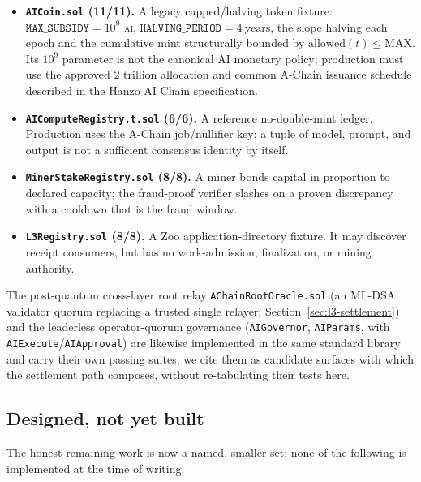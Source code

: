 \begin{itemize}[leftmargin=1.4em]
the proof-type profiles.
\item \textbf{\texttt{AICoin.sol} (11/11).} A legacy capped/halving token fixture:
$\texttt{MAX\_SUBSIDY}=10^9$ \textsc{ai}, $\texttt{HALVING\_PERIOD}=4\ \text{years}$, the
slope halving each epoch and the cumulative mint structurally bounded by
$\text{allowed}(t)\le\text{MAX}$. Its $10^9$ parameter is not the canonical \textsc{AI}
monetary policy; production must use the approved $2$ trillion allocation and common
A-Chain issuance schedule described in the Hanzo AI Chain specification.
\item \textbf{\texttt{AIComputeRegistry.t.sol} (6/6).} A reference no-double-mint ledger.
Production uses the A-Chain job/nullifier key; a tuple of model, prompt, and output is not a
sufficient consensus identity by itself.
\item \textbf{\texttt{MinerStakeRegistry.sol} (8/8).} A miner bonds capital in proportion to
declared capacity; the fraud-proof verifier slashes on a proven discrepancy with a cooldown
that is the fraud window.
\item \textbf{\texttt{L3Registry.sol} (8/8).} A Zoo application-directory fixture. It
may discover receipt consumers, but has no work-admission, finalization, or mining authority.
\end{itemize}

The post-quantum cross-layer root relay \texttt{AChainRootOracle.sol} (an ML-DSA validator
quorum replacing a trusted single relayer; Section~\ref{sec:l3-settlement}) and the
leaderless operator-quorum governance (\texttt{AIGovernor},
\texttt{AIParams}, with \texttt{AIExecute}/\texttt{AIApproval}) are likewise
implemented in the same standard library and carry their own passing suites; we cite them
as candidate surfaces with which the settlement path composes,
without re-tabulating their tests here.

\subsection{Designed, not yet built}

The honest remaining work is now a named, smaller set; none of the following is implemented
at the time of writing.

